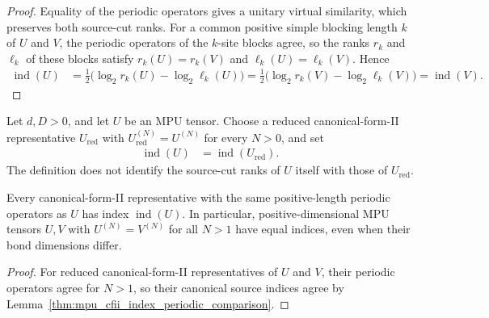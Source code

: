 \begin{proof}\leanok
    Equality of the periodic operators gives a unitary virtual similarity,
    which preserves both source-cut ranks. For a common positive simple
    blocking length $k$ of $U$ and $V$, the periodic
    operators of the $k$-site blocks agree, so the ranks
    $r_k$ and $\ell_k$ of these blocks satisfy
    $r_k(U)=r_k(V)$ and $\ell_k(U)=\ell_k(V)$. Hence
    \begin{align}
        \operatorname{ind}(U)
         & =\frac12\bigl(\log_2 r_k(U)-\log_2\ell_k(U)\bigr)
        =\frac12\bigl(\log_2 r_k(V)-\log_2\ell_k(V)\bigr)
        =\operatorname{ind}(V).
    \end{align}
\end{proof}

\begin{definition}
    \label{def:mpu_reduced_representative_index}
    \leanok
    Let $d,D>0$, and let $U$ be an MPU tensor. Choose a reduced
    canonical-form-II representative $U_{\mathrm{red}}$ with
    $U_{\mathrm{red}}^{(N)}=U^{(N)}$ for every $N>0$, and set
    \begin{align}
        \operatorname{ind}(U) & =\operatorname{ind}(U_{\mathrm{red}}).
    \end{align}
    The definition does not identify the source-cut ranks of $U$ itself
    with those of $U_{\mathrm{red}}$.
\end{definition}

\begin{lemma}
    \label{thm:mpu_reduced_representative_index_invariance}
    \leanok
    Every canonical-form-II representative with the same positive-length
    periodic operators as $U$ has index $\operatorname{ind}(U)$. In
    particular, positive-dimensional MPU tensors $U,V$ with
    $U^{(N)}=V^{(N)}$ for all $N>1$ have equal indices, even when their
    bond dimensions differ.
\end{lemma}

\begin{proof}\leanok
    For reduced canonical-form-II representatives of $U$ and $V$,
    their periodic operators agree for $N>1$, so their canonical source
    indices agree by Lemma~\ref{thm:mpu_cfii_index_periodic_comparison}.
\end{proof}

